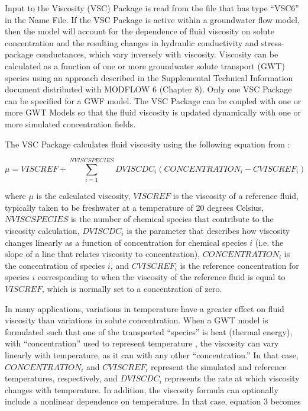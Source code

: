 Input to the Viscosity (VSC) Package is read from the file that has type ``VSC6'' in the Name File.  If the VSC Package is active within a groundwater flow model, then the model will account for the dependence of fluid viscosity on solute concentration and the resulting changes in hydraulic conductivity and stress-package conductances, which vary inversely with viscosity.  Viscosity can be calculated as a function of one or more groundwater solute transport (GWT) species using an approach described in the Supplemental Technical Information document distributed with MODFLOW 6 (Chapter 8).  Only one VSC Package can be specified for a GWF model. The VSC Package can be coupled with one or more GWT Models so that the fluid viscosity is updated dynamically with one or more simulated concentration fields.

The VSC Package calculates fluid viscosity using the following equation from \cite{langevin2008seawat}:

\begin{equation}
\label{eqn:visclinear}
\mu = VISCREF + \sum_{i=1}^{NVISCSPECIES} DVISCDC_i \left ( CONCENTRATION_i - CVISCREF_i \right )
\end{equation}

\noindent where $\mu$ is the calculated viscosity, $VISCREF$ is the viscosity of a reference fluid, typically taken to be freshwater at a temperature of 20 degrees Celsius, $NVISCSPECIES$ is the number of chemical species that contribute to the viscosity calculation, $DVISCDC_i$ is the parameter that describes how viscosity changes linearly as a function of concentration for chemical species $i$ (i.e. the slope of a line that relates viscosity to concentration), $CONCENTRATION_i$ is the concentration of species $i$, and $CVISCREF_i$ is the reference concentration for species $i$ corresponding to when the viscosity of the reference fluid is equal to $VISCREF$, which is normally set to a concentration of zero.

In many applications, variations in temperature have a greater effect on fluid viscosity than variations in solute concentration. When a GWT model is formulated such that one of the transported ``species'' is heat (thermal energy), with ``concentration'' used to represent temperature \citep{zheng2010supplemental}, the viscosity can vary linearly with temperature, as it can with any other ``concentration.''  In that case, $CONCENTRATION_i$ and $CVISCREF_i$ represent the simulated and reference temperatures, respectively, and $DVISCDC_i$ represents the rate at which viscosity changes with temperature. In addition, the viscosity formula can optionally include a nonlinear dependence on temperature. In that case, equation 3 becomes

